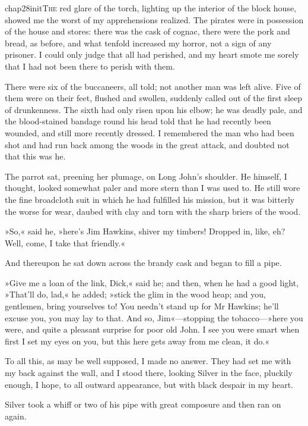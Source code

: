 
   \lettrine[lines=4,image=true]{chap28initT}{he} red glare of the torch, lighting up the interior of the block house, showed me the worst of my apprehensions realized. The pirates were in possession of the house and stores: there was the cask of cognac, there were the pork and bread, as before, and what tenfold increased my horror, not a sign of any prisoner. I could only judge that all had perished, and my heart smote me sorely that I had not been there to perish with them.

There were six of the buccaneers, all told; not another man was left alive. Five of them were on their feet, flushed and swollen, suddenly called out of the first sleep of drunkenness. The sixth had only risen upon his elbow; he was deadly pale, and the blood-stained bandage round his head told that he had recently been wounded, and still more recently dressed. I remembered the man who had been shot and had run back among the woods in the great attack, and doubted not that this was he.

The parrot sat, preening her plumage, on Long John's shoulder. He himself, I thought, looked somewhat paler and more stern than I was used to. He still wore the fine broadcloth suit in which he had fulfilled his mission, but it was bitterly the worse for wear, daubed with clay and torn with the sharp briers of the wood.

»So,« said he, »here's Jim Hawkins, shiver my timbers! Dropped in, like, eh? Well, come, I take that friendly.«

And thereupon he sat down across the brandy cask and began to fill a pipe.

»Give me a loan of the link, Dick,« said he; and then, when he had a good light, »That'll do, lad,« he added; »stick the glim in the wood heap; and you, gentlemen, bring yourselves to! You needn't stand up for Mr Hawkins; he'll excuse you, you may lay to that. And so, Jim«—stopping the tobacco—»here you were, and quite a pleasant surprise for poor old John. I see you were smart when first I set my eyes on you, but this here gets away from me clean, it do.«

To all this, as may be well supposed, I made no answer. They had set me with my back against the wall, and I stood there, looking Silver in the face, pluckily enough, I hope, to all outward appearance, but with black despair in my heart.

Silver took a whiff or two of his pipe with great composure and then ran on again.

